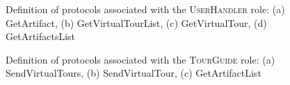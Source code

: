 \documentclass[paper=letter, fontsize=12pt]{article}
\begin{document}
\begin{figure}[H]
  \begin{center}
    \caption{Definition of protocols associated with the \textsc{UserHandler} role: (a) \fontfamily{\sfdefault}\selectfont GetArtifact, (b) GetVirtualTourList, (c) GetVirtualTour, (d) GetArtifactsList}
    \label{fig:uh_protocol}
  \end{center}
\end{figure}
\begin{figure}[H]
  \begin{center}
    \caption{Definition of protocols associated with the \textsc{TourGuide} role: (a) \fontfamily{\sfdefault}\selectfont SendVirtualTours, (b) SendVirtualTour, (c) GetArtifactList}
    \label{fig:tg_protocol}
  \end{center}
\end{figure}
\end{document}
